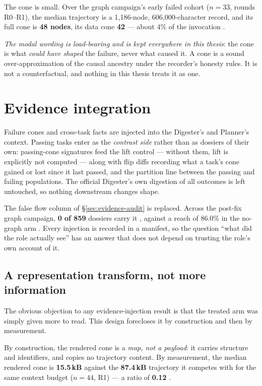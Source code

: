 The cone is small. Over the graph campaign's early failed cohort ($n{=}33$,
rounds R0--R1), the median trajectory is a 1{,}186-node, 606{,}000-character
record, and its full cone is \textbf{48 nodes}, its data cone \textbf{42}
--- about $4\%$ of the invocation .

\emph{The modal wording is load-bearing and is kept everywhere in this
thesis}: the cone is what \emph{could have shaped} the failure, never what
caused it. A cone is a sound over-approximation of the causal ancestry
under the recorder's honesty rules. It is not a counterfactual, and
nothing in this thesis treats it as one.

\section{Evidence integration}
\label{sec:evidence-integration}

Failure cones and cross-task facts are injected into the Digester's and
Planner's context. Passing tasks enter as the \emph{contrast side} rather
than as dossiers of their own: passing-cone signatures feed the lift
control --- without them, lift is explicitly not computed --- along with
flip diffs recording what a task's cone gained or lost since it last
passed, and the partition line between the passing and failing
populations. The official Digester's own digestion of all outcomes is left
untouched, so nothing downstream changes shape.

The false flow column of \S\ref{sec:evidence-audit} is replaced. Across the
post-fix graph campaign, \textbf{0 of 859} dossiers carry it , against
a reach of $86.0\%$ in the no-graph arm . Every injection is recorded
in a manifest, so the question ``what did the role actually see'' has an
answer that does not depend on trusting the role's own account of it.

\subsection*{A representation transform, not more information}

The obvious objection to any evidence-injection result is that the treated
arm was simply given more to read. This design forecloses it by
construction and then by measurement.

By construction, the rendered cone is a \emph{map, not a payload}: it
carries structure and identifiers, and copies no trajectory content. By
measurement, the median rendered cone is \textbf{15.5\,kB} against the
\textbf{87.4\,kB} trajectory it competes with for the same context budget
($n{=}44$, R1) --- a ratio of \textbf{0.12} .

